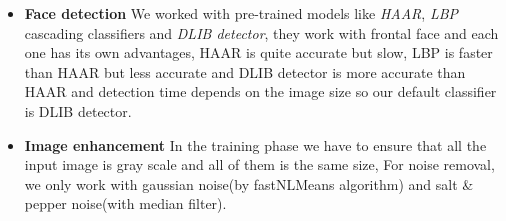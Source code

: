 \begin{itemize}
	\item \textbf{Face detection} We worked with pre-trained models like \textit{HAAR}, \textit{LBP} cascading classifiers and \textit{DLIB detector}, they work with frontal face and each one has its own advantages, HAAR is quite accurate but slow, LBP is faster than HAAR but less accurate and DLIB detector is more accurate than HAAR and detection time depends on the image size so our default classifier is DLIB detector. 
	
	\item \textbf{Image enhancement} In the training phase we have to ensure that all the input image is gray scale and all of them is the same size, For noise removal, we only work with gaussian noise(by fastNLMeans algorithm) and salt \& pepper noise(with median filter).
\end{itemize}

